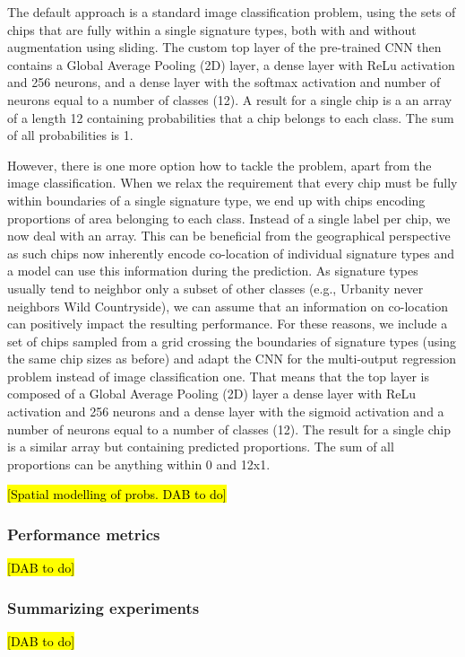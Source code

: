 
The default approach is a standard image classification problem, using the sets of chips
that are fully within a single signature types, both with and without augmentation using
sliding. The custom top layer of the pre-trained CNN then contains a Global Average
Pooling (2D) layer, a dense layer with ReLu activation and 256 neurons, and a dense
layer with the softmax activation and number of neurons equal to a number of classes
(12). A result for a single chip is a an array of a length 12 containing probabilities
that a chip belongs to each class. The sum of all probabilities is 1.


However, there is one more option how to tackle the problem, apart from the image
classification. When we relax the requirement that every chip must be fully within
boundaries of a single signature type, we end up with chips encoding proportions of area
belonging to each class. Instead of a single label per chip, we now deal with an array.
This can be beneficial from the geographical perspective as such chips now inherently
encode co-location of individual signature types and a model can use this information
during the prediction. As signature types usually tend to neighbor only a subset of
other classes (e.g., Urbanity never neighbors Wild Countryside), we can assume that an
information on co-location can positively impact the resulting performance. For these
reasons, we include a set of chips sampled from a grid crossing the boundaries of
signature types (using the same chip sizes as before) and adapt the CNN for the
multi-output regression problem instead of image classification one. That means that the
top layer is composed of a Global Average Pooling (2D) layer a dense layer with ReLu
activation and 256 neurons and a dense layer with the sigmoid activation and a number of
neurons equal to a number of classes (12). The result for a single chip is a similar
array but containing predicted proportions. The sum of all proportions can be anything
within 0 and 12x1.


\hl{[Spatial modelling of probs. DAB to do]}

\subsubsection{Performance metrics}

\hl{[DAB to do]}




\subsubsection{Summarizing experiments}



\hl{[DAB to do]}

